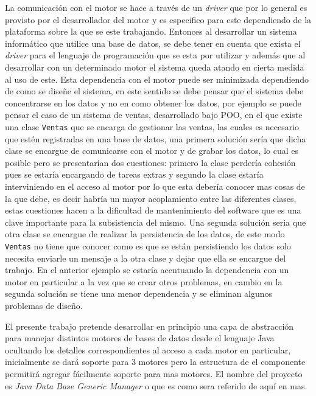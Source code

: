 La comunicación con el motor se hace a través de un \textit{driver} que por lo general es provisto por el desarrollador del motor y es especifico para este dependiendo de la plataforma sobre la que se este trabajando. Entonces al desarrollar un sistema informático que utilice una base de datos,  se debe tener en cuenta que exista el \textit{driver} para el lenguaje de programación que se esta por utilizar y además que al desarrollar con un determinado motor el sistema queda atando en cierta medida al uso de este. Esta dependencia con el motor puede ser minimizada dependiendo de como se diseñe el sistema, en este sentido se debe pensar que el sistema debe concentrarse en los datos y no en como obtener los datos, por ejemplo se puede pensar el caso de un sistema de ventas, desarrollado bajo POO, en el que existe una clase \verb=Ventas= que se encarga de gestionar las ventas, las cuales es necesario que estén registradas en una base de datos, una primera solución sería que dicha clase se encargue de comunicarse con el motor y de grabar los datos, lo cual es posible pero se presentarían dos cuestiones: primero la clase perdería cohesión pues se estaría encargando de tareas extras y segundo la clase estaría interviniendo en el acceso al motor por lo que esta debería conocer mas cosas de la que debe, es decir habría un mayor acoplamiento entre las diferentes clases, estas cuestiones hacen a la dificultad de mantenimiento del software que es una clave importante para la subsistencia del mismo. Una segunda solución seria que otra clase se encargue de realizar la persistencia de los datos, de este modo \verb=Ventas= no tiene que conocer como es que se están persistiendo los datos solo necesita enviarle un mensaje a la otra clase y dejar que ella se encargue del trabajo. En el anterior ejemplo se estaría acentuando la dependencia con un motor en particular a la vez que se crear otros problemas, en cambio en la segunda solución se tiene una menor dependencia y se eliminan algunos problemas de diseño.

El presente trabajo pretende desarrollar en principio una capa de abstracción para manejar distintos motores de bases de datos desde el lenguaje Java ocultando los detalles correspondientes al acceso a cada motor en particular, inicialmente se dará soporte para 3 motores pero  la estructura de el componente permitirá agregar fácilmente soporte para mas motores. El nombre del proyecto es \textit{Java Data Base Generic Manager} o \jj que es como sera referido de aquí en mas.
%
%
